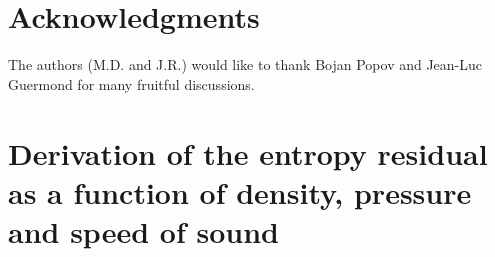\documentclass[preprint,10pt]{elsarticle}
\begin{document}

\section*{Acknowledgments} 
The authors (M.D. and J.R.) would like to thank Bojan Popov and Jean-Luc Guermond for many fruitful discussions.  


\newpage
\appendix

\section{Derivation of the entropy residual as a function of density, pressure and speed of sound} \label{app:ent_res}
\end{document}
